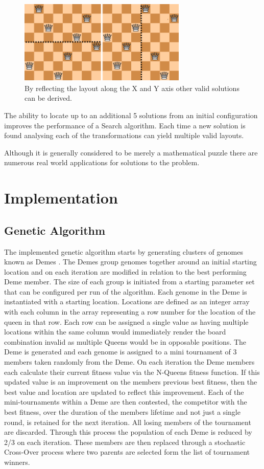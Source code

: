 \documentclass[a4paper,onecolumn,11pt]{article}
\begin{document}
\begin{figure}[!htbp]
	\centering	
	\includegraphics[width=8cm, height=4cm]{Valid8QueensReflected}
	\caption{By reflecting the layout along the X and Y axis other valid solutions can be derived.}
\end{figure}

The ability to locate up to an additional 5 solutions from an initial configuration improves the performance of a Search algorithm. Each time a new solution is found analysing each of the transformations can yield multiple valid layouts.

Although it is generally considered to be merely a mathematical puzzle there are numerous real world applications for solutions to the problem.


\section{Implementation}
\subsection{Genetic Algorithm}
The implemented genetic algorithm starts by generating clusters of genomes known as Demes \cite{Demes}. The Demes group genomes together around an initial starting location and on each iteration are modified in relation to the best performing Deme member. The size of each group is initiated from a starting parameter set that can be configured per run of the algorithm. Each genome in the Deme is instantiated with a starting location. Locations are defined as an integer array with each column in the array representing a row number for the location of the queen in that row. Each row can be assigned a single value as having multiple locations within the same column would immediately render the board combination invalid as multiple Queens would be in opposable positions. The Deme is generated and each genome is assigned to a mini tournament of 3 members taken randomly from the Deme. On each iteration the Deme members each calculate their current fitness value via the N-Queens fitness function. If this updated value is an improvement on the members previous best fitness, then the best value and location are updated to reflect this improvement. Each of the mini-tournaments within a Deme are then contested, the competitor with the best fitness, over the duration of the members lifetime and not just a single round, is retained for the next iteration. All losing members of the tournament are discarded. Through this process the population of each Deme is reduced by 2/3 on each iteration. These members are then replaced through a stochastic Cross-Over process where two parents are selected form the list of tournament winners.
\end{document}
